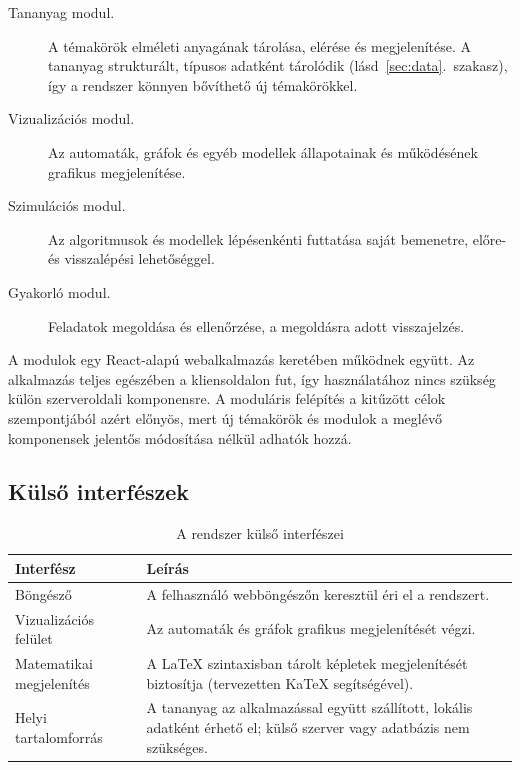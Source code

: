 \documentclass[12pt,a4paper]{report}
\begin{document}
\begin{description}
    \item[Tananyag modul.] A témakörök elméleti anyagának tárolása,
          elérése és megjelenítése. A tananyag strukturált, típusos
          adatként tárolódik (lásd~\ref{sec:data}.~szakasz), így a
          rendszer könnyen bővíthető új témakörökkel.
    \item[Vizualizációs modul.] Az automaták, gráfok és egyéb modellek
          állapotainak és működésének grafikus megjelenítése.
    \item[Szimulációs modul.] Az algoritmusok és modellek lépésenkénti
          futtatása saját bemenetre, előre- és visszalépési
          lehetőséggel.
    \item[Gyakorló modul.] Feladatok megoldása és ellenőrzése, a
          megoldásra adott visszajelzés.
\end{description}

A modulok egy React-alapú webalkalmazás keretében működnek együtt. Az
alkalmazás teljes egészében a kliensoldalon fut, így használatához nincs
szükség külön szerveroldali komponensre. A moduláris felépítés a
kitűzött célok szempontjából azért előnyös, mert új témakörök és
modulok a meglévő komponensek jelentős módosítása nélkül adhatók hozzá.

\subsection{Külső interfészek}

\begin{table}[htbp]
    \centering
    \begin{tabularx}{\textwidth}{p{4.2cm} X}
        \toprule
        \textbf{Interfész} & \textbf{Leírás} \\
        \midrule
        Böngésző &
        A felhasználó webböngészőn keresztül éri el a rendszert. \\
        Vizualizációs felület &
        Az automaták és gráfok grafikus megjelenítését végzi. \\
        Matematikai megjelenítés &
        A \LaTeX{} szintaxisban tárolt képletek megjelenítését
        biztosítja (tervezetten KaTeX segítségével). \\
        Helyi tartalomforrás &
        A tananyag az alkalmazással együtt szállított, lokális adatként
        érhető el; külső szerver vagy adatbázis nem szükséges. \\
        \bottomrule
    \end{tabularx}
    \caption{A rendszer külső interfészei}
    \label{tab:interfaces}
\end{table}
\end{document}
